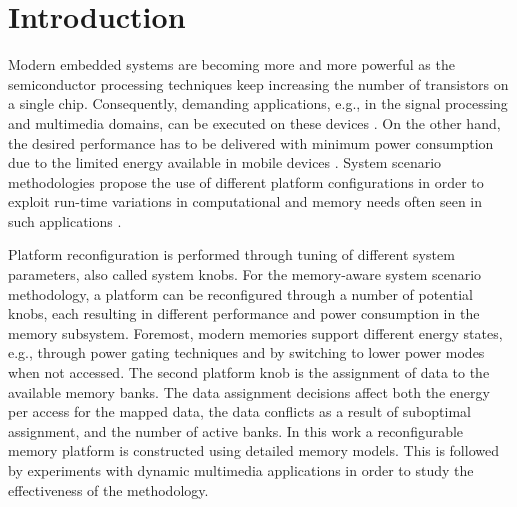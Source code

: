 \documentclass[smallcondensed]{svjour3}
\begin{document}
\section{Introduction}
\label{sec:introduction}

Modern embedded systems are becoming more and more powerful as the semiconductor processing techniques keep increasing the number of transistors on a single chip. 
Consequently, demanding applications, e.g., in the signal processing and multimedia domains, can be executed on these devices \cite{narasinga}. 
On the other hand, the desired performance has to be delivered with minimum power consumption due to the limited energy available in mobile devices \cite{tcm}. 
System scenario methodologies propose the use of different platform configurations in order to exploit run-time variations in computational and memory needs often seen in such applications \cite{tcm}.

Platform reconfiguration is performed through tuning of different system parameters, also called system knobs. 
For the memory-aware system scenario methodology, a platform can be reconfigured through a number of potential knobs, each resulting in different performance and power consumption in the memory subsystem. 
Foremost, modern memories support different energy states, e.g., through power gating techniques and by switching to lower power modes when not accessed. 
The second platform knob is the assignment of data to the available memory banks.
The data assignment decisions affect both the energy per access for the mapped data, the data conflicts as a result of suboptimal assignment, and the number of active banks. 
In this work a reconfigurable memory platform is constructed using detailed memory models. 
This is followed by experiments with dynamic multimedia applications in order to study the effectiveness of the methodology.
\end{document}
